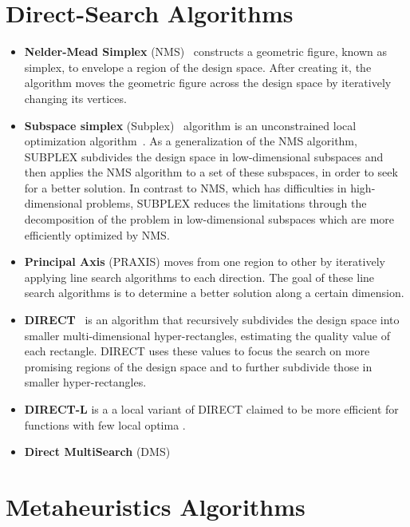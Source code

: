 \section{Direct-Search Algorithms}
\begin{itemize}
	\item \textbf{Nelder-Mead Simplex} (NMS)~\cite{Nelder1964} constructs a geometric figure, known as simplex, to envelope a region of the design space. After creating it, the algorithm moves the geometric figure across the design space by iteratively changing its vertices.
	
	\item \textbf{Subspace simplex} (Subplex)~\cite{Rowan1990} algorithm is an unconstrained local optimization algorithm~\cite{Rowan1990}. As a generalization of the NMS algorithm, SUBPLEX subdivides the design space in low-dimensional subspaces and then applies the NMS algorithm to a set of these subspaces, in order to seek for a better solution. In contrast to NMS, which has difficulties in high-dimensional problems, SUBPLEX reduces the limitations through the decomposition of the problem in low-dimensional subspaces which are more efficiently optimized by NMS.
	
	\item \textbf{Principal Axis} (PRAXIS) moves from one region to other by iteratively applying line search algorithms to each direction. The goal of these line search algorithms is to determine a better solution along a certain dimension.
	
	\item \textbf{DIRECT}~\cite{Jones1993DIRECT} is an algorithm that recursively subdivides the design space into smaller multi-dimensional hyper-rectangles, estimating the quality value of each rectangle. DIRECT uses these values to focus the search on more promising regions of the design space and to further subdivide those in smaller hyper-rectangles. 
	
	\item \textbf{DIRECT-L} is a a local variant of DIRECT claimed to be more efficient for functions with few local optima .
	
	
	\item \textbf{Direct MultiSearch} (DMS) %


\end{itemize}	

\section{Metaheuristics Algorithms}

